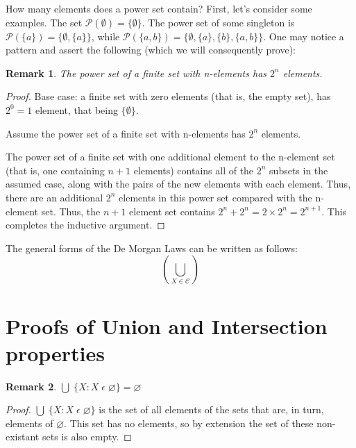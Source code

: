 \documentclass[12pt]{article}
\newtheorem{remark}{Remark}
\begin{document}
How many elements does a power set contain? First, let's consider some examples. The set $\mathcal{P}(\emptyset) = \{\emptyset\}$.
The power set of some singleton is $\mathcal{P}(\{a\}) = \{\emptyset, \{a\}\}$, while $\mathcal{P}(\{a, b\}) = \{\emptyset, \{a\}, \{b\}, \{a, b\}\}$.
One may notice a pattern and assert the following (which we will consequently prove):

\begin{remark}
    The power set of a finite set with n-elements has $2^n$ elements.
\end{remark}
\begin{proof}
    Base case: a finite set with zero elements (that is, the empty set), has $2^0 = 1$ element, that being
    $\{\emptyset\}$.

    Assume the power set of a finite set with n-elements has $2^n$ elements.

    The power set of a finite set with one additional element to the n-element set (that is, one containing $n + 1$ elements)
    contains all of the $2^n$ subsets in the assumed case, along with the pairs of the new elements with each element. Thus,
    there are an additional $2^n$ elements in this power set compared with the n-element set. Thus, the $n + 1$
    element set contains $2^n + 2^n = 2 \times 2^n = 2^{n + 1}$. This completes the inductive argument.
\end{proof}

The general forms of the De Morgan Laws can be written as follows:
\begin{equation}
    (\bigcup_{X \in \mathcal{C}})
\end{equation}





\appendix
\section{Proofs of Union and Intersection properties}\label{Appendix: Unions and Intersections proofs}
\begin{remark}
    $\bigcup\;\{X: X\;\epsilon\;\varnothing\} = \varnothing$
\end{remark}
\begin{proof}
    $\bigcup\;\{X: X\;\epsilon\;\varnothing\}$ is the set of all elements of the sets that are, in turn,
    elements of $\varnothing$. This set has no elements, so by extension the set of these non-existant
    sets is also empty.
\end{proof}
\end{document}
